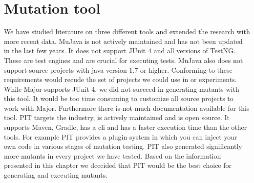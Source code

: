 \documentclass[../main]{subfiles}
\begin{document}
\section{Mutation tool}
We have studied literature on three different tools and extended the research with more recent data.
MuJava is not actively maintained and has not been updated in the last few years.
It does not support JUnit 4 and all versions of TestNG\cite{mujava}.
These are test engines and are crucial for executing tests.
MuJava also does not support source projects with java version 1.7 or higher\cite{mujava}.
Conforming to these requirements would recude the set of projects we could use in or experiments.
\newline
While Major supports JUnit 4,
we did not succeed in generating mutants with this tool.
It would be too time consuming to customize all source projects to work with Major.
Furthermore there is not much documentation available for this tool.
\newline
PIT targets the industry, is actively maintained and is open source\cite{Kintis2016AnalysingStudy}.
It supports Maven, Gradle, has a \acrfull{cli} and has a faster execution time than the other tools.
For example PIT provides a plugin system in which you can inject your own code in various stages of mutation testing\cite{pit}.
PIT also generated significantly more mutants in every project we have tested.
Based on the information presented in this chapter we dcecided that PIT would be the best choice for generating and executing mutants.
\end{document}
